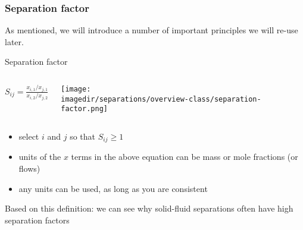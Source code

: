 \begin{frame}\frametitle{Separation factor}
	As mentioned, we will introduce a number of important principles we will re-use later.

	\begin{exampleblock}{{\color{purple} Separation factor}}
		\begin{columns}[c]
				$S_{ij} = \displaystyle \frac{x_{i,1} / x_{j,1}}{x_{i,2} / x_{j,2}}$
				\begin{center}
					\texttt{[image: \\imagedir/separations/overview-class/separation-factor.png]}
				\end{center}
		\end{columns}
	\end{exampleblock}

	\begin{itemize}
		\item	select $i$ and $j$ so that $S_{ij} \geq 1$
		\item	units of the $x$ terms in the above equation can be mass or mole fractions (or flows)
		\item	any units can be used, as long as you are consistent
	\end{itemize}

	Based on this definition: we can see why solid-fluid separations often have high separation factors
\end{frame}